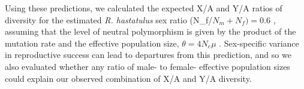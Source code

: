 \documentclass[9pt,twocolumn,twoside]{gsajnl}
\begin{document}









 Using these predictions, we calculated the expected X/A and Y/A ratios of diversity for the estimated \textit{R. hastatulus} sex ratio (N_{f}/$N_{m}+N_{f})=0.6$ \citep{pickup2013influence}, assuming that the level of neutral polymorphism is given by the product of the mutation rate and the effective population size, $\theta=4N_{e}\mu$ \citep{watterson1975}. Sex-specific variance in reproductive success can lead to departures from this prediction, and so we also evaluated whether any ratio of male- to female- effective population sizes could explain our observed combination of X/A and Y/A diversity.
\end{document}
